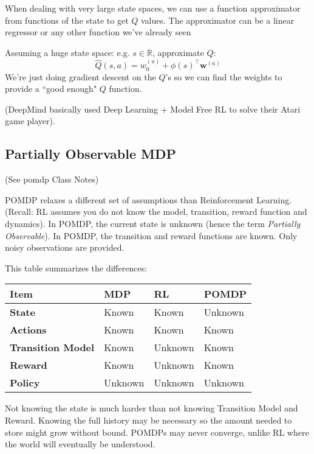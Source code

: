 \documentclass[11pt, oneside]{article}   	%
\begin{document}
When dealing with very large state spaces, we can use a function approximator from functions of the state to get $Q$ values.  The approximator can be a linear regressor or any other function we've already seen

Assuming a huge state space: e.g. $s \in \mathbb{R}$, approximate $Q$:
\begin{equation}
\hat{Q}(s,a) = w_0^{(a)} + \phi(s)^\intercal \mathbf{w}^{(a)}
\end{equation}
We're just doing gradient descent on the $Q$'s so we can find the weights to provide a ``good enough" $Q$ function.

(DeepMind basically used Deep Learning + Model Free RL to solve their Atari game player).

\subsection{Partially Observable MDP}

(See pomdp Class Notes)

POMDP relaxes a different set of assumptions than Reinforcement Learning. (Recall: RL assumes you do not know the model, transition, reward function and dynamics). In POMDP, the current state is unknown (hence the term \emph{Partially Observable}). In POMDP, the transition and reward functions are known. Only noisy observations are provided.

This table summarizes the differences:
\begin{center}
	\begin{tabular}{| l | l | l | l |}
	\hline
	\bf{Item}  			& \bf{MDP} & \bf{RL} & \bf{POMDP} \\ \hline
	\bf{State}	  		& Known & Known & Unknown \\ \hline
	\bf{Actions} 			& Known & Known   & Known     \\ \hline
	\bf{Transition Model} 	& Known & Unknown & Known   \\ \hline
	\bf{Reward}			& Known & Unknown & Known 	 \\ \hline
	\bf{Policy}			& Unknown & Unknown & Unknown \\ 
	\hline
	\end{tabular}
\end{center}

Not knowing the state is much harder than not knowing Transition Model and Reward. Knowing the full history may be 
necessary so the amount needed to store might grow without bound. POMDPs may never converge, unlike RL where the world will eventually be understood.
\end{document}
